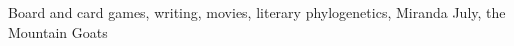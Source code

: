 \documentclass[margin, 10pt]{res} %
\begin{document}
\begin{resume}
Board and card games, writing, movies, literary phylogenetics, Miranda July, the Mountain Goats

%
%
%
%
%


\end{resume}
\end{document}
